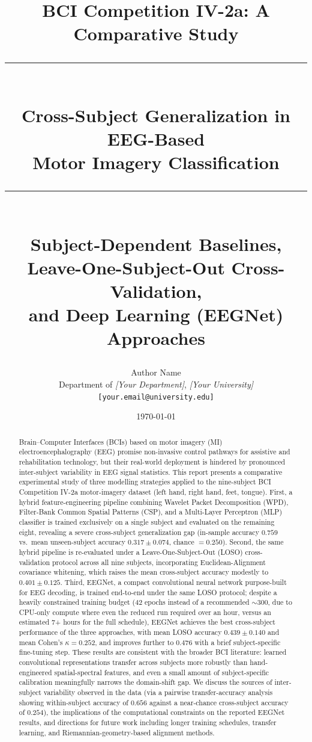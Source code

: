 \documentclass[11pt,a4paper]{article}
\title{
    \vspace{-1.5cm}
    {\large BCI Competition IV-2a: A Comparative Study}\\[0.4cm]
    \rule{\linewidth}{0.5pt}\\[0.3cm]
    {\Huge \bfseries Cross-Subject Generalization in EEG-Based \\[0.2cm] Motor Imagery Classification}\\[0.3cm]
    \rule{\linewidth}{0.5pt}\\[0.4cm]
    {\large Subject-Dependent Baselines, Leave-One-Subject-Out Cross-Validation, \\
    and Deep Learning (EEGNet) Approaches}
}
\author{
    Author Name \\
    \small Department of \emph{[Your Department]}, \emph{[Your University]} \\
    \small \texttt{[your.email@university.edu]}
}
\date{\today}
\begin{document}
\maketitle
\thispagestyle{empty}

\begin{abstract}
\noindent
Brain--Computer Interfaces (BCIs) based on motor imagery (MI) electroencephalography (EEG) promise
non-invasive control pathways for assistive and rehabilitation technology, but their real-world
deployment is hindered by pronounced inter-subject variability in EEG signal statistics. This report
presents a comparative experimental study of three modelling strategies applied to the nine-subject
BCI Competition IV-2a motor-imagery dataset (left hand, right hand, feet, tongue). First, a hybrid
feature-engineering pipeline combining Wavelet Packet Decomposition (WPD), Filter-Bank Common Spatial
Patterns (CSP), and a Multi-Layer Perceptron (MLP) classifier is trained exclusively on a single
subject and evaluated on the remaining eight, revealing a severe cross-subject generalization gap
(in-sample accuracy $0.759$ vs.\ mean unseen-subject accuracy $0.317 \pm 0.074$, chance $=0.250$).
Second, the same hybrid pipeline is re-evaluated under a Leave-One-Subject-Out (LOSO) cross-validation
protocol across all nine subjects, incorporating Euclidean-Alignment covariance whitening, which
raises the mean cross-subject accuracy modestly to $0.401 \pm 0.125$. Third, EEGNet, a compact
convolutional neural network purpose-built for EEG decoding, is trained end-to-end under the same
LOSO protocol; despite a heavily constrained training budget (42 epochs instead of a recommended
$\sim$300, due to CPU-only compute where even the reduced run required over an hour, versus an
estimated 7+ hours for the full schedule), EEGNet achieves the best cross-subject performance of the
three approaches, with mean LOSO accuracy $0.439 \pm 0.140$ and mean Cohen's $\kappa = 0.252$, and
improves further to $0.476$ with a brief subject-specific fine-tuning step. These results are
consistent with the broader BCI literature: learned convolutional representations transfer across
subjects more robustly than hand-engineered spatial-spectral features, and even a small amount of
subject-specific calibration meaningfully narrows the domain-shift gap. We discuss the sources of
inter-subject variability observed in the data (via a pairwise transfer-accuracy analysis showing
within-subject accuracy of $0.656$ against a near-chance cross-subject accuracy of $0.254$), the
implications of the computational constraints on the reported EEGNet results, and directions for
future work including longer training schedules, transfer learning, and Riemannian-geometry-based
alignment methods.
\end{abstract}
\end{document}
